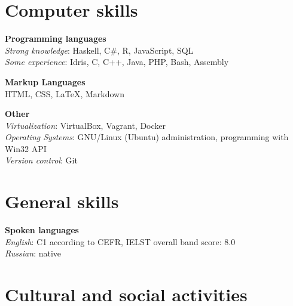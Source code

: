 \documentclass[11pt,a4paper,sans]{moderncv} %
\begin{document}
\section{Computer skills}

  {\large \textbf{Programming languages}} \\
      \emph{Strong knowledge}: Haskell, C\#, R, JavaScript, SQL \\
      \emph{Some experience}: Idris, C, C++, Java, PHP, Bash, Assembly

  {\large \textbf{Markup Languages}} \\
  HTML, CSS, \LaTeX, Markdown

  {\large \textbf{Other}} \\
  \emph{Virtualization}: VirtualBox, Vagrant, Docker \\
  \emph{Operating Systems}: GNU/Linux (Ubuntu) administration,
                            programming with Win32 API \\
  \emph{Version control}: Git
\section{General skills}

  {\large \textbf{Spoken languages}} \\
      \emph{English}: C1 according to CEFR, IELST overall band score: 8.0 \\
      \emph{Russian}: native
\section{Cultural and social activities}

\end{document}
